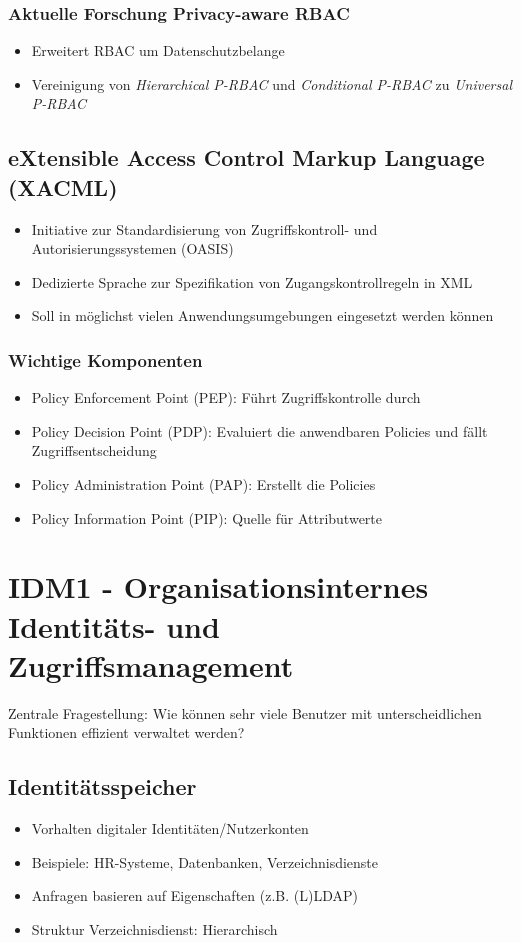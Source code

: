 \subsubsection{Aktuelle Forschung Privacy-aware RBAC}
\begin{itemize}
	\item Erweitert RBAC um Datenschutzbelange
	\item Vereinigung von \textit{Hierarchical P-RBAC} und \textit{Conditional P-RBAC} zu \textit{Universal P-RBAC}
\end{itemize}


\subsection{eXtensible Access Control Markup Language (XACML)}
\begin{itemize}
	\item Initiative zur Standardisierung von Zugriffskontroll- und Autorisierungssystemen (OASIS)
	\item Dedizierte Sprache zur Spezifikation von Zugangskontrollregeln in XML
	\item Soll in möglichst vielen Anwendungsumgebungen eingesetzt werden können
\end{itemize}

\subsubsection{Wichtige Komponenten}
\begin{itemize}
	\item Policy Enforcement Point (PEP): Führt Zugriffskontrolle durch
	\item Policy Decision Point (PDP): Evaluiert die anwendbaren Policies und fällt Zugriffsentscheidung
	\item Policy Administration Point (PAP): Erstellt die Policies
	\item Policy Information Point (PIP): Quelle für Attributwerte
\end{itemize}



\section{IDM1 - Organisationsinternes Identitäts- und Zugriffsmanagement}
Zentrale Fragestellung: Wie können sehr viele Benutzer mit unterscheidlichen Funktionen effizient verwaltet werden?

\subsection{Identitätsspeicher}
\begin{itemize}
	\item Vorhalten digitaler Identitäten/Nutzerkonten
	\item Beispiele: HR-Systeme, Datenbanken, Verzeichnisdienste
	\item Anfragen basieren auf Eigenschaften (z.B. (L)LDAP)
	\item Struktur Verzeichnisdienst: Hierarchisch
\end{itemize}



